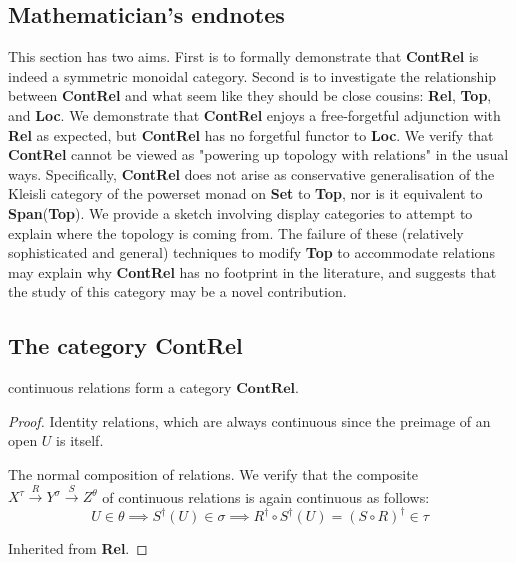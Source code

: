 \begin{fullwidth}

\section{Mathematician's endnotes}

This section has two aims. First is to formally demonstrate that \textbf{ContRel} is indeed a symmetric monoidal category. Second is to investigate the relationship between \textbf{ContRel} and what seem like they should be close cousins: \textbf{Rel}, \textbf{Top}, and \textbf{Loc}. We demonstrate that \textbf{ContRel} enjoys a free-forgetful adjunction with \textbf{Rel} as expected, but \textbf{ContRel} has no forgetful functor to \textbf{Loc}. We verify that \textbf{ContRel} cannot be viewed as "powering up topology with relations" in the usual ways. Specifically, \textbf{ContRel} does not arise as conservative generalisation of the Kleisli category of the powerset monad on \textbf{Set} to \textbf{Top}, nor is it equivalent to \textbf{Span}(\textbf{Top}). We provide a sketch involving display categories to attempt to explain where the topology is coming from. The failure of these (relatively sophisticated and general) techniques to modify \textbf{Top} to accommodate relations may explain why \textbf{ContRel} has no footprint in the literature, and suggests that the study of this category may be a novel contribution.

\subsection{The category \textbf{ContRel}}

\begin{proposition}
continuous relations form a category $\mathbf{ContRel}$.
\begin{proof}
 Identity relations, which are always continuous since the preimage of an open $U$ is itself.

 The normal composition of relations. We verify that the composite $X^\tau \overset{R}{\rightarrow} Y^\sigma \overset{S}{\rightarrow} Z^\theta$ of continuous relations is again continuous as follows:
\[U \in \theta \implies S^\dag(U) \in \sigma \implies R^\dag \circ S^\dag(U) = (S \circ R)^\dag \in \tau\]

 Inherited from \textbf{Rel}.
\end{proof}
\end{proposition}


\end{fullwidth}
